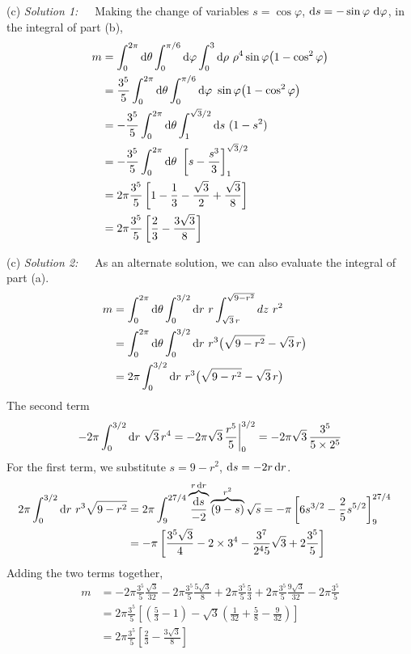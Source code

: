 \begin{solution}
(c) \emph{Solution 1:}\ \ \  Making the change of variables $s=\cos\varphi$, 
$\mathrm{d}s=-\sin\varphi\ \mathrm{d}\varphi$, in the integral of part (b),
\begin{align*}
m&=\int_0^{2\pi}\dee{\theta}\int_0^{\pi/6}\dee{\varphi}
  \int_0^3\dee{\rho}\ \rho^4\sin\varphi \big(1-\cos^2\varphi\big) \\
&=\frac{3^5}{5}\int_0^{2\pi}\dee{\theta}\int_0^{\pi/6}\dee{\varphi}\ \sin\varphi
\big(1-\cos^2\varphi\big) \\
&=-\frac{3^5}{5}\int_0^{2\pi}\dee{\theta}\int_1^{\sqrt{3}/2}\dee{s}\  (1-s^2) \\
&=-\frac{3^5}{5}\int_0^{2\pi}\dee{\theta}\ \left[s-\frac{s^3}{3}\right]_1^{\sqrt{3}/2} \\
&=2\pi \frac{3^5}{5} \left[1-\frac{1}{3}-\frac{\sqrt{3}}{2}+\frac{\sqrt{3}}{8}\right] \\
&=2\pi \frac{3^5}{5} \left[\frac{2}{3}-\frac{3\sqrt{3}}{8}\right]
\end{align*}

(c) \emph{Solution 2:}\ \ \ 
As an alternate solution, we can also evaluate the integral of part (a).
\begin{align*}
m&=\int_0^{2\pi}\dee{\theta}\int_0^{3/2}\dee{r}\ r\int_{\sqrt{3}\,r}^{\sqrt{9-r^2}}dz\ r^2\cr
&=\int_0^{2\pi}\dee{\theta}\int_0^{3/2}\dee{r}\ r^3\big(\sqrt{9-r^2}-\sqrt{3}\,r\big)\cr
&=2\pi\int_0^{3/2}\dee{r}\ r^3\big(\sqrt{9-r^2}-\sqrt{3}\,r\big)
\end{align*}
The second term
\begin{equation*}
-2\pi\int_0^{3/2}\dee{r}\ \sqrt{3}\,r^4=-2\pi\sqrt{3}\,\frac{r^5}{5}\bigg|_0^{3/2}
=-2\pi\sqrt{3}\,\frac{3^5}{5\times  2^5}
\end{equation*}
For the first term, we substitute $s=9-r^2$, $\mathrm{d}s=-2r\,\mathrm{d}r$.
\begin{align*}
2\pi\int_0^{3/2}\mathrm{d}r\ r^3\sqrt{9-r^2}
&=2\pi\int_9^{27/4}\overbrace{\frac{\mathrm{d}s}{-2}}^{r\,\mathrm{d}r}
        \overbrace{(9-s)}^{r^2} \sqrt{s}
=-\pi \left[6s^{3/2}-\frac{2}{5}s^{5/2}\right]_9^{27/4}\cr
&=-\pi \left[\frac{3^5\sqrt{3}}{4}-2\times 3^4
         -\frac{3^7}{2^4 5}\sqrt{3}+2\frac{3^5}{5}\right]
\end{align*}
Adding the two terms together,
\begin{align*}
m&=-2\pi\frac{3^5}{5} \frac{\sqrt{3}}{32}
   -2\pi\frac{3^5}{5} \frac{5\sqrt{3}}{8}
   +2\pi\frac{3^5}{5} \frac{5}{3}
   +2\pi\frac{3^5}{5} \frac{9\sqrt{3}}{32}
   -2\pi\frac{3^5}{5}
\\
&=2\pi\frac{3^5}{5}\left[\left(\frac{5}{3}-1\right)
-\sqrt{3}\left(\frac{1}{32}+\frac{5}{8}-\frac{9}{32}\right)\right] \\
&=2\pi \frac{3^5}{5} \left[\frac{2}{3}-\frac{3\sqrt{3}}{8}\right]
\end{align*}

\end{solution}
